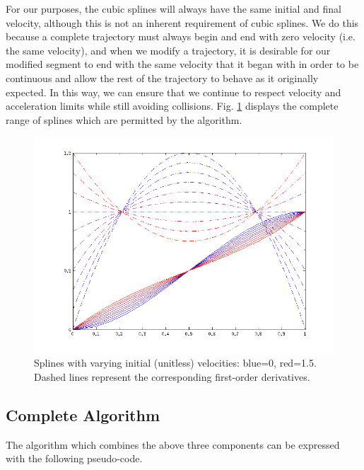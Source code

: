 \documentclass[letterpaper, 10 pt, conference]{ieeeconf}  %
\begin{document}
For our purposes, the cubic splines will always have the same initial and final velocity, although this is not an inherent requirement of cubic splines. We do this because a complete trajectory must always begin and end with zero velocity (i.e. the same velocity), and when we modify a trajectory, it is desirable for our modified segment to end with the same velocity that it began with in order to be continuous and allow the rest of the trajectory to behave as it originally expected. In this way, we can ensure that we continue to respect velocity and acceleration limits while still avoiding collisions. Fig. \ref{fig:splines} displays the complete range of splines which are permitted by the algorithm.

\begin{figure}[h]
    \includegraphics[width=\columnwidth]{pictures/splines}
    \caption{Splines with varying initial (unitless) velocities: blue=0, red=1.5. Dashed lines represent the corresponding first-order derivatives.}
    \label{fig:splines}
\end{figure}

\subsection{Complete Algorithm}

The algorithm which combines the above three components can be expressed with the following pseudo-code.
\end{document}
